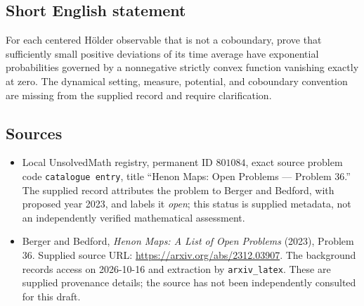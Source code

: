 \documentclass[11pt]{article}
\begin{document}
\subsection{Short English statement}
For each centered H\"older observable that is not a coboundary, prove that sufficiently small positive deviations of its time average have exponential probabilities governed by a nonnegative strictly convex function vanishing exactly at zero. The dynamical setting, measure, potential, and coboundary convention are missing from the supplied record and require clarification.
\subsection{Sources}
\begin{itemize}
\item Local UnsolvedMath registry, permanent ID \(801084\), exact source problem code \texttt{catalogue entry}, title ``Henon Maps: Open Problems --- Problem 36.'' The supplied record attributes the problem to Berger and Bedford, with proposed year 2023, and labels it \emph{open}; this status is supplied metadata, not an independently verified mathematical assessment.
\item Berger and Bedford, \emph{Henon Maps: A List of Open Problems} (2023), Problem 36. Supplied source URL: \url{https://arxiv.org/abs/2312.03907}. The background records access on 2026-10-16 and extraction by \texttt{arxiv\_latex}. These are supplied provenance details; the source has not been independently consulted for this draft.
\end{itemize}
\end{document}
